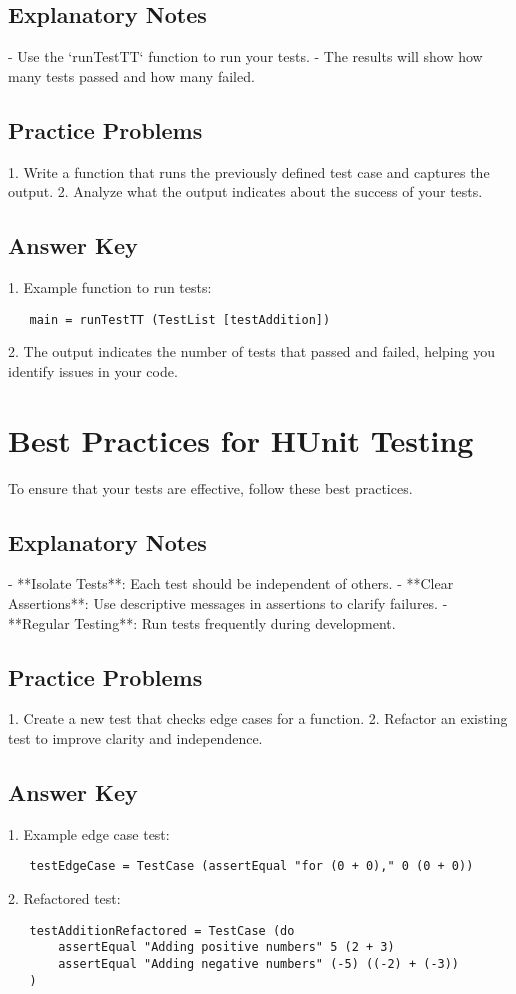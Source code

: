 \documentclass{article}
\begin{document}
\subsection*{Explanatory Notes}
- Use the `runTestTT` function to run your tests.
- The results will show how many tests passed and how many failed.

\subsection*{Practice Problems}
1. Write a function that runs the previously defined test case and captures the output.
2. Analyze what the output indicates about the success of your tests.

\subsection*{Answer Key}
1. Example function to run tests:
   \begin{verbatim}
   main = runTestTT (TestList [testAddition])
   \end{verbatim}
2. The output indicates the number of tests that passed and failed, helping you identify issues in your code.

\section*{Best Practices for HUnit Testing}
To ensure that your tests are effective, follow these best practices.

\subsection*{Explanatory Notes}
- **Isolate Tests**: Each test should be independent of others.
- **Clear Assertions**: Use descriptive messages in assertions to clarify failures.
- **Regular Testing**: Run tests frequently during development.

\subsection*{Practice Problems}
1. Create a new test that checks edge cases for a function.
2. Refactor an existing test to improve clarity and independence.

\subsection*{Answer Key}
1. Example edge case test:
   \begin{verbatim}
   testEdgeCase = TestCase (assertEqual "for (0 + 0)," 0 (0 + 0))
   \end{verbatim}
2. Refactored test:
   \begin{verbatim}
   testAdditionRefactored = TestCase (do
       assertEqual "Adding positive numbers" 5 (2 + 3)
       assertEqual "Adding negative numbers" (-5) ((-2) + (-3))
   )
   \end{verbatim}
\end{document}
